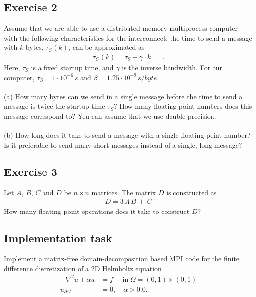 \documentclass[11pt]{article}
\begin{document}
\clearpage
\subsection*{Exercise 2}

Assume that we are able to use a distributed memory multiprocess computer with the 
following characteristics for the interconnect: the time to send a
message with $k$ bytes, $\tau_C(k)$, can be approximated as 
\begin{eqnarray*}
\tau_C(k) = \tau_S + \gamma \cdot k \,\,\,\,\,\,\,\,\,\, .
\end{eqnarray*}
Here, $\tau_S$ is a fixed startup time, and $\gamma$ is the inverse bandwidth.
For our computer, $\tau_S = 1\cdot 10^{-6} \,s$ and $\beta = 1.25\cdot  10^{-9}\, s/byte$.\\
\\
(a) How many bytes can we send in a single message before the time to send a message 
is twice the startup time $\tau_S$? How many floating-point numbers does this 
message correspond to? You can assume that we use double precision.\\
\\
(b) How long does it take to send a message with a single floating-point number?
Is it preferable to send many short messages instead of a single, long message? 

\subsection*{Exercise 3}

Let $\underline{A}$, $\underline{B}$, $\underline{C}$ and $\underline{D}$ be $n\times n$ matrices. 
The matrix $\underline{D}$ is constructed as 
\begin{eqnarray*}
\underline{D} = 3\,\underline{A}\,\underline{B} \,+\, \underline{C}
\end{eqnarray*}
How many floating point operations does it take to construct $\underline{D}$?

\subsection*{Implementation task}
Implement a matrix-free domain-decomposition based MPI code for the finite difference
discretization of a 2D Helmholtz equation
\[
  \begin{split}
    -\nabla^2 u + \alpha u &= f \quad \text{ in } \Omega = (0,1)\times(0,1) \\
    u_{\partial\Omega} &= 0, \quad \alpha > 0.0.
  \end{split}
\]
\end{document}
